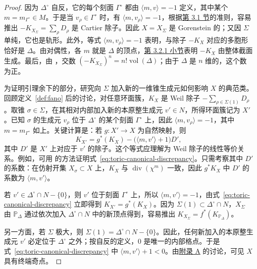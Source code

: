 \begin{proof}
因为 $\Delta^\circ$ 自反，它的每个刻面 $\Gamma^\circ$ 都由 $\langle m,v\rangle=-1$ 定义，其中某个 $m=m_{\Gamma^\circ}\in M$。于是当 $v_\rho\in\Gamma^\circ$ 时，有 $\langle m,v_\rho\rangle=-1$，根据\hyperref[sec:cones-fans]{第 3.1 节}的准则，容易推出 $-K_{X_\Sigma}=\sum_\rho D_\rho$ 是 Cartier 除子。因此 $X=X_\Sigma$ 是 Gorenstein 的；又因 $\Sigma$ 单纯，它也是轨形。此外，等式 $\langle m,v_\rho\rangle=-1$ 表明，与除子 $-K_X$ 对应的多胞形恰好是 $\Delta$。由对偶性，各 $m$ 就是 $\Delta$ 的顶点，\hyperref[subsec:toric-polytopes]{第 3.2.1 小节}表明 $-K_X$ 由整体截面生成。最后，由 ，交数 $(-K_{X_\Sigma})^n=n!\operatorname{vol}(\Delta)$；由于 $\Delta$ 是 $n$ 维的，这个数为正。

为证明引理余下的部分，研究向 $\Sigma$ 加入新的一维锥生成元如何影响 $X$ 的典范类。回顾定义~\ref{def:fano} 后的讨论，对任意环面簇，$K_X$ 是 Weil 除子 $-\sum_{\rho\in\Sigma(1)}D_\rho$。取锥 $\sigma\in\Sigma$，在其相对内部加入新的本原整生成元 $v'\in N$，所得环面簇记为 $X'$。已知 $\sigma$ 的生成元 $v_\rho$ 位于 $\Delta^\circ$ 的某个刻面 $\Gamma^\circ$ 上，因此 $\langle m,v_\rho\rangle=-1$，其中 $m=m_{\Gamma^\circ}$ 如上。关键计算是：若 $g:X'\to X$ 为自然映射，则
\begin{equation}\label{eq:toric-canonical-discrepancy}
K_{X'}=g^*(K_X)-\bigl(\langle m,v'\rangle+1\bigr)D',
\end{equation}
其中 $D'$ 是 $X'$ 上对应于 $v'$ 的除子。这个等式应理解为 Weil 除子的线性等价关系。例如，可用  的方法证明式~\eqref{eq:toric-canonical-discrepancy}。只需考察其中 $D'$ 的系数：在仿射开集 $X_\sigma\subset X$ 上，$K_X$ 与 $\operatorname{div}(\chi^m)$ 一致，因此 $g^*K_X$ 中 $D'$ 的系数为 $\langle m,v'\rangle$。

若 $v'\in\Delta^\circ\cap N-\{0\}$，则 $v'$ 位于刻面 $\Gamma^\circ$ 上，所以 $\langle m,v'\rangle=-1$，由式~\eqref{eq:toric-canonical-discrepancy} 立即得到 $K_{X'}=g^*(K_X)$。因为 $\Sigma(1)\subset\Delta^\circ\cap N$，$X_\Sigma$ 由 $\mathbb P_\Delta$ 通过依次加入 $\Delta^\circ\cap N$ 中的新顶点得到，容易推出 $K_{X_\Sigma}=f^*(K_{\mathbb P_\Delta})$。

另一方面，若 $\Sigma$ 极大，则 $\Sigma(1)=\Delta^\circ\cap N-\{0\}$。因此，任何新加入的本原整生成元 $v'$ 必定位于 $\Delta^\circ$ 之外；按自反的定义，$0$ 是唯一的内部格点。于是式~\eqref{eq:toric-canonical-discrepancy} 中 $\langle m,v'\rangle+1<0$。由\hyperref[app:singular-varieties]{附录 A} 的讨论，可见 $X$ 具有终端奇点。
\end{proof}

